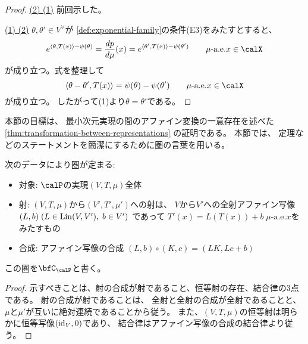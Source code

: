 \documentclass[report]{jlreq}
\begin{document}
\begin{proof}
    \uline{(2) \Rightarrow (1)} \quad
    前回示した。

    \uline{(1) \Rightarrow (2)} \quad
    $\theta, \theta' \in V^\vee$が
    \cref{def:exponential-family}の条件(E3)をみたすとすると、
    \begin{equation}
        e^{\langle \theta, T(x) \rangle - \psi(\theta)}
            = \dd[p]{\mu}(x)
            = e^{\langle \theta', T(x) \rangle - \psi(\theta')}
            \qquad
            \text{$\mu$-a.e.$x \in \calX$}
    \end{equation}
    が成り立つ。式を整理して
    \begin{equation}
        \langle \theta - \theta', T(x) \rangle
            = \psi(\theta) - \psi(\theta')
            \qquad
            \text{$\mu$-a.e.$x \in \calX$}
    \end{equation}
    が成り立つ。
    したがって(1)より$\theta = \theta'$である。
\end{proof}


本節の目標は、
最小次元実現の間のアファイン変換の一意存在を述べた
\cref{thm:transformation-between-representations}
の証明である。
本節では、
定理などのステートメントを簡潔にするために圏の言葉を用いる。

\begin{propdef}
    次のデータにより圏が定まる:
    \begin{itemize}
        \item 対象: $\calP$の実現$(V, T, \mu)$全体
        \item 射: $(V, T, \mu)$から$(V', T', \mu')$への射は、
            $V$から$V'$への全射アファイン写像
            $(L, b) \; (L \in \operatorname{Lin}(V, V'), \; b \in V')$
            であって
            $T'(x) = L(T(x)) + b \; \text{$\mu$-a.e.$x$}$をみたすもの
        \item 合成: アファイン写像の合成
            $(L, b) \circ (K, c) = (LK, Lc + b)$
    \end{itemize}
    この圏を$\bfC_\calP$と書く。
\end{propdef}

\begin{proof}
    示すべきことは、射の合成が射であること、恒等射の存在、結合律の3点である。
    射の合成が射であることは、
    全射と全射の合成が全射であることと、
    $\mu$と$\mu'$が互いに絶対連続であることから従う。
    また、$(V, T, \mu)$の恒等射は明らかに恒等写像$(\mathrm{id}_V, 0)$であり、
    結合律はアファイン写像の合成の結合律より従う。
\end{proof}
\end{document}
